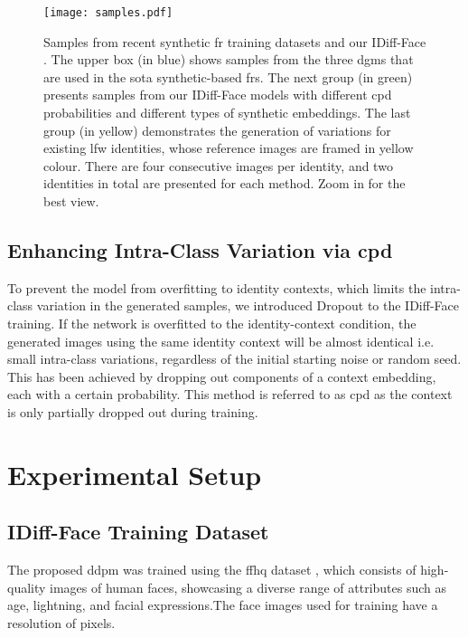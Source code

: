 \documentclass[10pt,twocolumn,letterpaper]{article}
\newcommand{\approachname}{IDiff-Face }
\begin{document}
\begin{figure}[!]
\begin{center}
   \texttt{[image: samples.pdf]}
\end{center}
\vspace{-5mm}
   \caption{Samples from recent synthetic \acrshort{fr} training datasets and our \approachname. The upper box (in blue) shows samples from the three \acrshort{dgm}s that are used in the \acrshort{sota} synthetic-based \acrshort{fr}s. The next group (in green) presents samples from our \approachname models with different \acrshort{cpd} probabilities and different types of synthetic embeddings. The last group (in yellow) demonstrates the generation of variations for existing \acrshort{lfw} identities, whose reference images are framed in yellow colour. There are four consecutive images per identity, and two identities in total are presented for each method. Zoom in for the best view.}
\label{fig:sample_overview}
\vspace{-5mm}
\end{figure}

\vspace{-1mm}
\subsection{Enhancing Intra-Class Variation via \acrshort{cpd}}
\vspace{-2mm}
To prevent the model from overfitting to identity contexts, which limits the intra-class variation in the generated samples, we introduced Dropout \cite{Srivastava2014} to the \approachname training. If the network is overfitted to the identity-context condition, the generated images using the same identity context will be almost identical i.e. small intra-class variations, regardless of the initial starting noise or random seed. 
This has been achieved by dropping out components of a context embedding, each with a certain probability. This method is referred to as \acrfull{cpd} as the context is only partially dropped out during training.

\vspace{-3mm}
\section{Experimental Setup }
\vspace{-1mm}
\subsection{\approachname Training Dataset}
\vspace{-1mm}
The proposed \acrshort{ddpm} was trained using the \acrshort{ffhq} dataset \cite{Karras2018}, which consists of  high-quality images of human faces, showcasing a diverse range of attributes such as age, lightning, and facial expressions.The face images used for training have a resolution of  pixels. 
\end{document}
